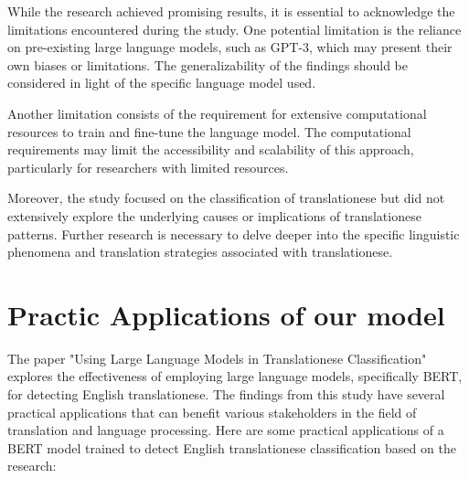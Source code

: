 While the research achieved promising results, it is essential to acknowledge the limitations encountered during the study. One potential limitation is the reliance on pre-existing large language models, such as GPT-3, which may present their own biases or limitations. The generalizability of the findings should be considered in light of the specific language model used.

Another limitation consists of the requirement for extensive computational resources to train and fine-tune the language model. The computational requirements may limit the accessibility and scalability of this approach, particularly for researchers with limited resources.

Moreover, the study focused on the classification of translationese but did not extensively explore the underlying causes or implications of translationese patterns. Further research is necessary to delve deeper into the specific linguistic phenomena and translation strategies associated with translationese.

\section{Practic Applications of our model}

The paper "Using Large Language Models in Translationese Classification" explores the effectiveness of employing large language models, specifically BERT, for detecting English translationese. The findings from this study have several practical applications that can benefit various stakeholders in the field of translation and language processing. Here are some practical applications of a BERT model trained to detect English translationese classification based on the research:

